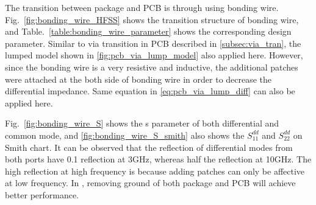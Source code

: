 \documentclass{book}  %
\renewcommand{\subsection}[1]{\psubsection{#1}}
\begin{document}
\begin{paper}
\subsection{Bonding Wire Transition}
\label{sec:bond_wire}
The transition between package and PCB is through using bonding wire. Fig.~\ref{fig:bonding_wire_HFSS} shows the transition structure of bonding wire, and Table.~\ref{table:bonding_wire_parameter} shows the corresponding design parameter. Similar to via transition in PCB described in \ref{subsec:via_tran}, the lumped model shown in \ref{fig:pcb_via_lump_model} also applied here. However, since the bonding wire is a very resistive and inductive, the additional patches were attached at the both side of bonding wire in order to decrease the differential impedance. Same equation in \ref{eq:pcb_via_lump_diff} can also be applied here. 

Fig.~\ref{fig:bonding_wire_S} shows the s parameter of both differential and common mode, and \ref{fig:bonding_wire_S_smith} also shows the $S^{dd}_{11}$ and $S^{dd}_{22}$ on Smith chart. It can be observed that the reflection of differential modes from both ports have 0.1 reflection at 3GHz, whereas half the reflection at 10GHz. The high reflection at high frequency is because adding patches can only be affective at low frequency. In \cite{1IWSPI2S2_FikarS_ScholtzAL_2008_100ghz_bandwidth}, removing ground of both package and PCB will achieve better performance. 


\end{paper}
\end{document}
